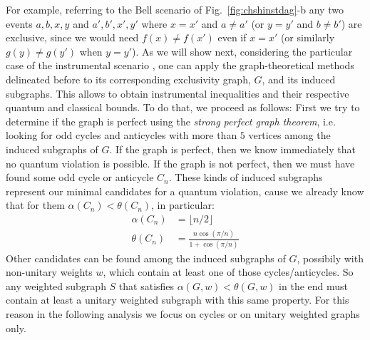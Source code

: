 \documentclass[letterpaper]{article}
\begin{document}
For example, referring to the Bell scenario of
Fig.~\ref{fig:chshinstdag}-b any two events $a,b,x,y$ and $a',b',x',y'$
where $x = x'$ and $a\neq a'$ (or $y = y'$ and $b \neq b'$) are exclusive,
since we would need $f(x) \neq f(x')$ even if $x = x'$ (or similarly
$g(y) \neq g(y')$ when $y = y'$).  As we will show next, considering the
particular case of the instrumental scenario \cite{pearl1995, bonet2001},
one can apply the graph-theoretical methods delineated before to its
corresponding exclusivity graph, $G$, and its induced subgraphs. This
allows to obtain instrumental inequalities and their respective quantum
and classical bounds.  To do that, we proceed as follows: First we try to
determine if the graph is perfect using the \emph{strong perfect graph
theorem}, i.e. looking for odd cycles and anticycles with more than $5$
vertices among the induced subgraphs of $G$.  If the graph is perfect,
then we know immediately that no quantum violation is possible.  If the
graph is not perfect, then we must have found some odd cycle or anticycle
$C_n$. These kinds of induced subgraphs represent our minimal candidates
for a quantum violation, cause we already know that for them $\alpha(C_n)
< \theta(C_n)$, in particular:
\begin{equation}
\begin{aligned}
    \alpha(C_n) &= \lfloor n/2 \rfloor \\ 
    \theta(C_n) &= \frac{n\cos(\pi/n)}{1+\cos(\pi/n)}
\end{aligned}
\label{eq:cycle_alpha_theta}
\end{equation}
Other candidates can be found among the induced subgraphs of $G$,
possibily with non-unitary weights $w$, which contain at least one of
those cycles/anticycles.  So any weighted subgraph $S$ that satisfies
$\alpha(G,w) < \theta(G,w)$ in the end must contain at least a unitary
weighted subgraph with this same property.  For this reason in the
following analysis we focus on cycles or on unitary weighted graphs only.
\end{document}
